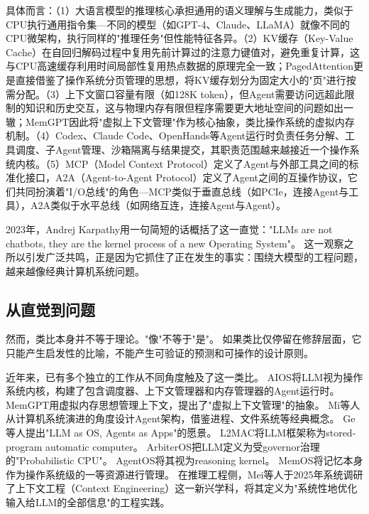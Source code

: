 具体而言：（1）大语言模型的推理核心承担通用的语义理解与生成能力，类似于CPU执行通用指令集---不同的模型（如GPT-4、Claude、LLaMA）就像不同的CPU微架构，执行同样的"推理任务"但性能特征各异。（2）KV缓存（Key-Value Cache）在自回归解码过程中复用先前计算过的注意力键值对，避免重复计算，这与CPU高速缓存利用时间局部性复用热点数据的原理完全一致；PagedAttention\cite{kwon2023pagedattention}更是直接借鉴了操作系统分页管理的思想，将KV缓存划分为固定大小的"页"进行按需分配。（3）上下文窗口容量有限（如128K token），但Agent需要访问远超此限制的知识和历史交互，这与物理内存有限但程序需要更大地址空间的问题如出一辙；MemGPT\cite{memgpt2023}因此将"虚拟上下文管理"作为核心抽象，类比操作系统的虚拟内存机制。（4）Codex\cite{openai_codex_overview_2026}、Claude Code\cite{anthropic_claudecode_overview_2026}、OpenHands\cite{openhands_paper_2025}等Agent运行时负责任务分解、工具调度、子Agent管理、沙箱隔离与结果提交，其职责范围越来越接近一个操作系统内核。（5）MCP（Model Context Protocol）\cite{mcp_intro_2026}定义了Agent与外部工具之间的标准化接口，A2A（Agent-to-Agent Protocol）\cite{google_a2a_2025}定义了Agent之间的互操作协议，它们共同扮演着"I/O总线"的角色---MCP类似于垂直总线（如PCIe，连接Agent与工具），A2A类似于水平总线（如网络互连，连接Agent与Agent）\cite{agentprotocols2025}。

2023年，Andrej Karpathy用一句简短的话概括了这一直觉："LLMs are not chatbots, they are the kernel process of a new Operating System"\cite{karpathy2023llmos}。
这一观察之所以引发广泛共鸣，正是因为它抓住了正在发生的事实：围绕大模型的工程问题，越来越像经典计算机系统问题。

\subsection{从直觉到问题}

然而，类比本身并不等于理论。"像"不等于"是"。
如果类比仅停留在修辞层面，它只能产生启发性的比喻，不能产生可验证的预测和可操作的设计原则。

近年来，已有多个独立的工作从不同角度触及了这一类比。
AIOS将LLM视为操作系统内核，构建了包含调度器、上下文管理器和内存管理器的Agent运行时\cite{mei2024aios}。
MemGPT用虚拟内存思想管理上下文，提出了"虚拟上下文管理"的抽象\cite{memgpt2023}。
Mi等人从计算机系统演进的角度设计Agent架构，借鉴进程、文件系统等经典概念\cite{mi2025llmagentscomputersystems}。
Ge等人提出"LLM as OS, Agents as Apps"的愿景\cite{ge2023llmos}。
L2MAC将LLM框架称为stored-program automatic computer\cite{holt2024l2mac}。
ArbiterOS把LLM定义为受governor治理的"Probabilistic CPU"\cite{arbiteros2025}。
AgentOS将其视为reasoning kernel\cite{agentos2025}。
MemOS将记忆本身作为操作系统级的一等资源进行管理\cite{memos2025}。
在推理工程侧，Mei等人于2025年系统调研了上下文工程（Context Engineering）这一新兴学科，将其定义为"系统性地优化输入给LLM的全部信息"的工程实践\cite{contextengineer_survey2025}。


